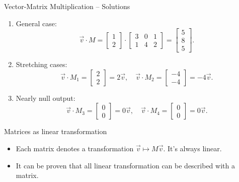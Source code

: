 \documentclass{beamer}
\begin{document}
\begin{frame}{Vector-Matrix Multiplication – Solutions}
  \begin{enumerate}
    \item General case:
    \begin{equation}
    \vec{v} \cdot M = \begin{bmatrix} 1 \\ 2 \end{bmatrix} \cdot
    \begin{bmatrix} 3 & 0 & 1 \\ 1 & 4 & 2 \end{bmatrix}
    = \begin{bmatrix} 5 \\ 8 \\ 5 \end{bmatrix}.
    \end{equation}
    \item Stretching cases:
    \begin{equation}
    \vec{v} \cdot M_1 = \begin{bmatrix} 2 \\ 2 \end{bmatrix}=2\vec{v}, \quad
    \vec{v} \cdot M_2 = \begin{bmatrix} -4 \\ -4 \end{bmatrix} = -4\vec{v}.
    \end{equation}
    \item Nearly null output:
    \begin{equation}
    \vec{v} \cdot M_3 = \begin{bmatrix} 0 \\ 0 \end{bmatrix}=0\vec{v}, \quad
    \vec{v} \cdot M_4 = \begin{bmatrix} 0 \\ 0 \end{bmatrix}=0\vec{v}.
    \end{equation}
  \end{enumerate}
\end{frame}

\begin{frame}{Matrices as linear transformation}

\begin{itemize}
    \item Each matrix denotes a transformation $\vec{v} \mapsto M\vec{v}$. It's always linear.
    \item It can be proven that all linear transformation can be described with a matrix.
    
\end{itemize}
    
\end{frame}
\end{document}
